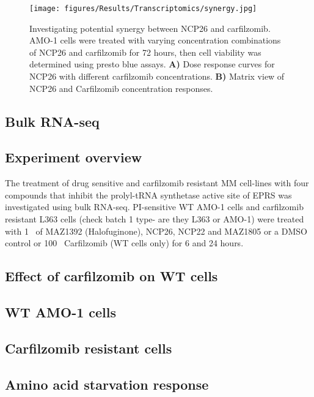 \begin{figure}[h]
\centering
\texttt{[image: figures/Results/Transcriptomics/synergy.jpg]}
\caption[NCP26 and carfilzomib synergism]{Investigating potential synergy between NCP26 and carfilzomib.
AMO-1 cells were treated with varying concentration combinations of NCP26 and carfilzomib for 72 hours, then cell viability was determined using presto blue assays.
\textbf{A)} Dose response curves for NCP26 with different carfilzomib concentrations.
\textbf{B)} Matrix view of NCP26 and Carfilzomib concentration responses.
}
\label{fig:synergy}\end{figure}

\subsection{Bulk RNA-seq}

\subsection{Experiment overview}
The treatment of drug sensitive and carfilzomib resistant MM cell-lines with four compounds that inhibit  the  prolyl-tRNA  synthetase  active  site  of  EPRS  was investigated using bulk RNA-seq.
PI-sensitive WT AMO-1 cells and carfilzomib resistant L363 cells (check batch 1 type- are they L363 or AMO-1) were treated with 1\si{\micro\Molar} of MAZ1392 (Halofuginone), NCP26, NCP22 and MAZ1805 or a DMSO control or 100\si{\nano\Molar} Carfilzomib (WT cells only) for 6 and 24 hours.

\subsection{Effect of carfilzomib on WT cells}

\subsection{WT AMO-1 cells}

\subsection{Carfilzomib resistant cells}


\subsection{Amino acid starvation response}



